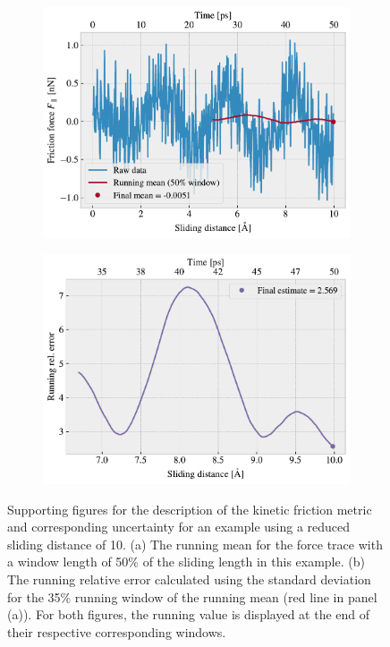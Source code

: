 \begin{figure}[!htb]
  \centering
  \begin{subfigure}[t]{0.49\textwidth}
    \centering
    \includegraphics[width=\textwidth]{figures/baseline/Ff_runmean.pdf}
    \caption{}
    \label{fig:runmean}
  \end{subfigure}
  \hfill
  \begin{subfigure}[t]{0.49\textwidth}
      \centering
      \includegraphics[width=\textwidth]{figures/baseline/Ff_runstd.pdf}
      \caption{}
      \label{fig:runstd}
  \end{subfigure}
  \caption{Supporting figures for the description of the kinetic friction metric and corresponding uncertainty for an example using a reduced sliding distance of \SI{10}{{}}. (a) The running mean for the force trace with a window length of 50\% of the sliding length in this example. (b) The running relative error calculated using the standard deviation for the 35\% running window of the running mean (red line in panel (a)). For both figures, the running value is displayed at the end of their respective corresponding windows.}
  \label{fig:running}
\end{figure}

